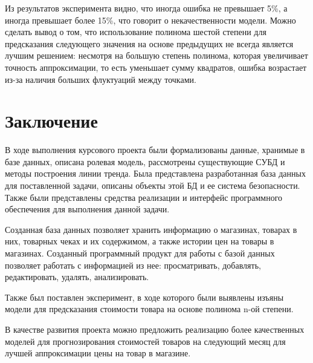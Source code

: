 \documentclass{bmstu}
\begin{document}
Из результатов эксперимента видно, что иногда ошибка не превышает 5\%, а иногда превышает более 15\%, что говорит о некачественности модели. Можно сделать вывод о том, что использование полинома шестой степени для предсказания следующего значения на основе предыдущих не всегда является лучшим решением: несмотря на большую степень полинома, которая увеличивает точность аппроксимации, то есть уменьшает сумму квадратов, ошибка возрастает из-за наличия больших флуктуаций между точками.


\chapter*{Заключение}

В ходе выполнения курсового проекта были формализованы данные, хранимые в базе данных, описана ролевая модель, рассмотрены существующие СУБД и методы построения линии тренда. Была представлена разработанная база данных для поставленной задачи, описаны объекты этой БД и ее система безопасности. Также были представлены средства реализации и интерфейс программного обеспечения для выполнения данной задачи.

Созданная база данных позволяет хранить информацию о магазинах, товарах в них, товарных чеках и их содержимом, а также истории цен на товары в магазинах. Созданный программный продукт для работы с базой данных позволяет работать с информацией из нее: просматривать, добавлять, редактировать, удалять, анализировать.

Также был поставлен эксперимент, в ходе которого были выявлены изъяны модели для предсказания стоимости товара на основе полинома n-ой степени.

В качестве развития проекта можно предложить реализацию более качественных моделей для прогнозирования стоимостей товаров на следующий месяц для лучшей аппроксимации цены на товар в магазине. 

\newpage
{}
\renewcommand\bibname{Список использованных источников}
\end{document}
